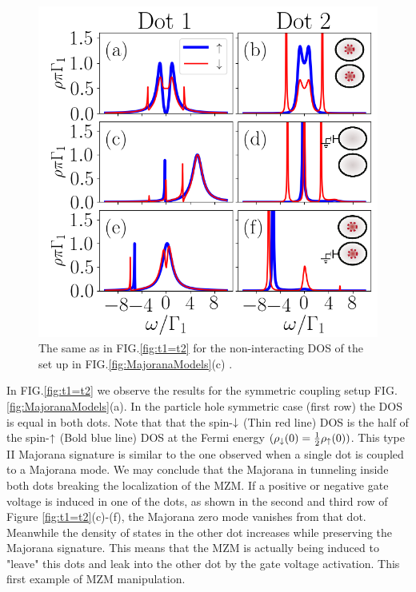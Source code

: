 \documentclass[showpacs,aps,prb,reprint,superscriptaddress]{revtex4-1}
\begin{document}
\begin{figure}[bt]
\begin{center}
\includegraphics[scale=0.48]{Graficos/t2>0.png}
\caption{  \label{fig:t2>0} The same as in FIG.\ref{fig:t1=t2} for the non-interacting DOS of the set up in FIG.\ref{fig:MajoranaModels}(c) .
}
%
\end{center}
\end{figure}
     
    
     In FIG.\ref{fig:t1=t2} we observe the results for the symmetric coupling setup FIG.\ref{fig:MajoranaModels}(a). In the particle hole symmetric case (first row) the DOS is equal in both dots. Note that that the spin-$\downarrow$ (Thin red line) DOS is the half of the spin-$\uparrow$ (Bold blue line) DOS at the Fermi energy $(\rho_\downarrow(0) = \frac{1}{2}\rho_\uparrow(0))$. This type II Majorana signature is similar to the one observed when a single dot is coupled to a Majorana mode. \cite{liu_detecting_2011} We may conclude that the Majorana in tunneling inside both dots breaking the localization of the MZM. If a positive or negative gate voltage is induced in one of the dots, as shown in the second and third row of Figure \ref{fig:t1=t2}(c)-(f),  the Majorana zero mode vanishes from that dot. Meanwhile the density of states in the other dot increases while preserving the Majorana signature. This means that the MZM is actually being induced to "leave" this dots and leak into the other dot by the gate voltage activation. This first example of MZM manipulation. 
\end{document}
